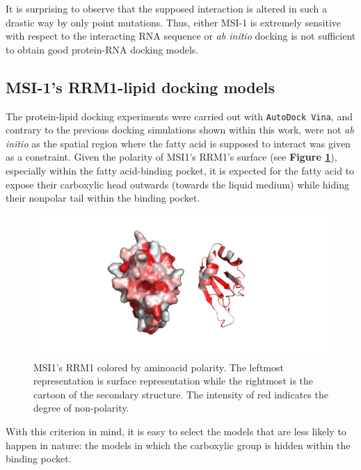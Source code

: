 It is surprising to observe that the supposed interaction is altered in such a drastic way by only point mutations. Thus, either MSI-1 is extremely sensitive with respect to the interacting RNA sequence or \textit{ab initio} docking is not sufficient to obtain good protein-RNA docking models.

\subsection{MSI-1's RRM1-lipid docking models}

The protein-lipid docking experiments were carried out with \texttt{AutoDock Vina}, and contrary to the previous docking simulations shown within this work, were not \textit{ab initio} as the spatial region where the fatty acid is supposed to interact was given as a constraint. Given the polarity of MSI1's RRM1's surface (see \textbf{Figure \ref{fig:RRM1polarity}}), especially within the fatty acid-binding pocket, it is expected for the fatty acid to expose their carboxylic head outwards (towards the liquid medium) while hiding their nonpolar tail within the binding pocket.

\begin{figure}[htbp!]
    \centering
    \includegraphics[width=\linewidth]{assets/RRM1_colored_polarity.png}
    \caption[MSI1's RRM1 colored by aminoacid polarity.]{MSI1's RRM1 colored by aminoacid polarity. The leftmost representation is surface representation while the rightmost is the cartoon of the secondary structure. The intensity of red indicates the degree of non-polarity.}
    \label{fig:RRM1polarity}
\end{figure}

With this criterion in mind, it is easy to select the models that are less likely to happen in nature: the models in which the carboxylic group is hidden within the binding pocket.\\

